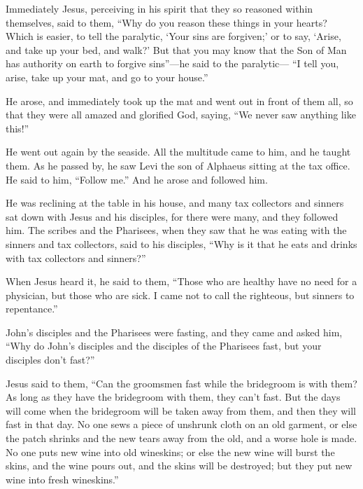  Immediately Jesus, perceiving in his spirit that they so
reasoned within themselves, said to them, ``Why do you reason these
things in your hearts?  Which is easier, to tell the
paralytic, `Your sins are forgiven;' or to say, `Arise, and take up your
bed, and walk?'  But that you may know that the Son of
Man has authority on earth to forgive sins''---he said to the
paralytic---  ``I tell you, arise, take up your mat, and
go to your house.''

 He arose, and immediately took up the mat and went out
in front of them all, so that they were all amazed and glorified God,
saying, ``We never saw anything like this!''

 He went out again by the seaside. All the multitude came
to him, and he taught them.  As he passed by, he saw Levi
the son of Alphaeus sitting at the tax office. He said to him, ``Follow
me.'' And he arose and followed him.

 He was reclining at the table in his house, and many tax
collectors and sinners sat down with Jesus and his disciples, for there
were many, and they followed him.  The scribes and the
Pharisees, when they saw that he was eating with the sinners and tax
collectors, said to his disciples, ``Why is it that he eats and drinks
with tax collectors and sinners?''

 When Jesus heard it, he said to them, ``Those who are
healthy have no need for a physician, but those who are sick. I came not
to call the righteous, but sinners to repentance.''

 John's disciples and the Pharisees were fasting, and
they came and asked him, ``Why do John's disciples and the disciples of
the Pharisees fast, but your disciples don't fast?''

 Jesus said to them, ``Can the groomsmen fast while the
bridegroom is with them? As long as they have the bridegroom with them,
they can't fast.  But the days will come when the
bridegroom will be taken away from them, and then they will fast in that
day.  No one sews a piece of unshrunk cloth on an old
garment, or else the patch shrinks and the new tears away from the old,
and a worse hole is made.  No one puts new wine into old
wineskins; or else the new wine will burst the skins, and the wine pours
out, and the skins will be destroyed; but they put new wine into fresh
wineskins.''

